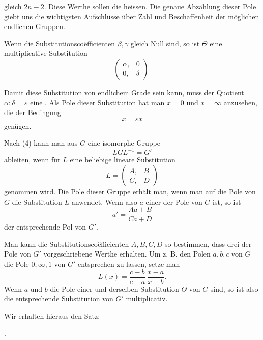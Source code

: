 gleich $2n-2$. Diese Werthe sollen die 
heissen. Die genaue Abzählung dieser Pole giebt uns die
wichtigsten Aufschlüsse über Zahl und Beschaffenheit der
möglichen endlichen Gruppen.

Wenn die Substitutionsco\"efficienten $\beta, \gamma$ gleich Null sind, so
ist $\Theta$ eine multiplicative Substitution
\[
\begin{pmatrix} \alpha, & 0 \\ 0, & \delta \end{pmatrix}.
\]

Damit diese Substitution von endlichem Grade sein kann,
muss der Quotient $\alpha : \delta = \varepsilon$ eine . Als Pole dieser Substitution
hat man $x = 0$ und $x = \infty$ anzusehen, die der Bedingung
\[
x = \varepsilon x
\]
genügen.

Nach (4) kann man aus $G$ eine isomorphe Gruppe
\[
L G L^{-1} = G'
\]
ableiten, wenn für $L$ eine beliebige lineare Substitution
\[
L = \begin{pmatrix} A, & B \\ C, & D \end{pmatrix}
\]
genommen wird. Die Pole dieser Gruppe erhält man, wenn
man auf die Pole von $G$ die Substitution $L$ anwendet. Wenn also
$a$ einer der Pole von $G$ ist, so ist
\[
a' = \frac{Aa + B}{Ca + D}
\]
der entsprechende Pol von $G'$.

Man kann die Substitutionsco\"efficienten $A, B, C, D$ so bestimmen,
dass drei der Pole von $G'$ vorgeschriebene Werthe erhalten.
Um z. B. den Polen $a, b, c$ von $G$ die Pole $0, \infty, 1$ von $G'$
entsprechen zu lassen, setze man
\[
L(x) = \frac{c-b}{c-a} \, \frac{x-a}{x-b}.
\]
Wenn $a$ und $b$ die Pole einer und derselben Substitution $\Theta$
von $G$ sind, so ist also die entsprechende Substitution von $G'$
multiplicativ.

Wir erhalten hieraus den Satz:

\par{}.\ 
